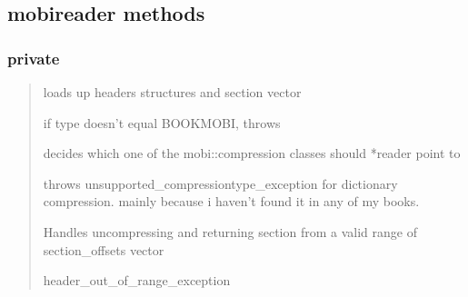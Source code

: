 \documentclass[letterpaper,10pt,english]{sphinxmanual}
\begin{document}
\subsection{mobireader methods}
\label{mobireader:mobireader-methods}

\subsubsection{private}
\label{mobireader:id1}\begin{quote}

\begin{fulllineitems}
\label{mobireader:parse_header}
loads up headers structures and section vector

if {\hyperref[mobireader:mobireader::db_header__st_palmdoc_db]{}}   type doesn't equal BOOKMOBI, throws
{\hyperref[exceptions:mobi::invalid_file_exception]{}}

\end{fulllineitems}


\begin{fulllineitems}
\label{mobireader:set_compression}
decides which one of the mobi::compression classes should *reader point to

throws unsupported\_compressiontype\_exception for dictionary compression.
mainly because i haven't found it in any of my books.

\end{fulllineitems}


\begin{fulllineitems}
\label{mobireader:mobireader::get_section_uncompressed__unsigned-iC}
Handles uncompressing and returning section from a valid range of
section\_offsets vector

header\_out\_of\_range\_exception

\end{fulllineitems}

\end{quote}
\end{document}
